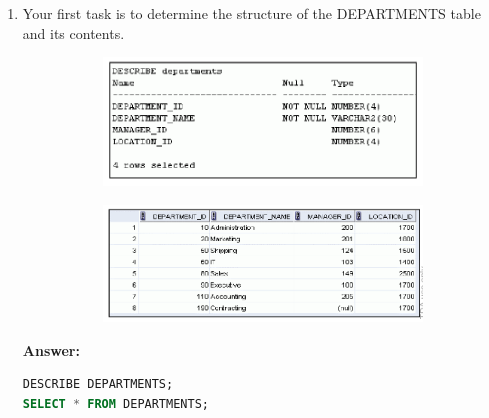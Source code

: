 \documentclass[a4paper,12pt]{article}
\begin{document}
\begin{enumerate}[start=4]
    \item Your first task is to determine the structure of the DEPARTMENTS table and its contents.
    \begin{figure}[h]
        \centering
        \begin{subfigure}[b]{0.45\linewidth}
            \centering
            \includegraphics[width=\linewidth]{graphics/4.1.png}
        \end{subfigure}
        \hspace{1em} %
        \begin{subfigure}[b]{0.45\linewidth}
            \centering
            \includegraphics[width=\linewidth]{graphics/4.2.png}
        \end{subfigure}
    \end{figure}
    
    \textbf{Answer: }
    \begin{lstlisting}[language=SQL]
DESCRIBE DEPARTMENTS;
SELECT * FROM DEPARTMENTS;
    \end{lstlisting}
    

\end{enumerate}
\end{document}
